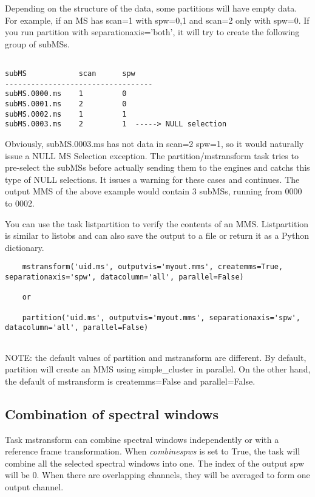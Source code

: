 Depending on the structure of the data, some partitions will have empty data.
For example, if an MS has scan=1 with spw=0,1 and scan=2 only with spw=0. If
you run partition with separationaxis='both', it will try to create the
following group of subMSs.

\begin{verbatim}

subMS            scan      spw
----------------------------------
subMS.0000.ms    1         0
subMS.0001.ms    2         0
subMS.0002.ms    1         1
subMS.0003.ms    2         1  -----> NULL selection

\end{verbatim}

Obviously, subMS.0003.ms has not data in scan=2 spw=1, so it would naturally
issue a NULL MS Selection exception. The partition/mstransform task tries to
pre-select the subMSs before actually sending them to the engines and catchs 
this type of NULL selections. It issues a warning for these cases and continues.
The output MMS of the above example would contain 3 subMSs, running from 0000
to 0002.

You can use the task listpartition to verify the contents of an MMS.
Listpartition is similar to listobs and can also save the output to a file
or return it as a Python dictionary.

\begin{verbatim}
    mstransform('uid.ms', outputvis='myout.mms', createmms=True, separationaxis='spw', datacolumn='all', parallel=False)
    
    or
    
    partition('uid.ms', outputvis='myout.mms', separationaxis='spw', datacolumn='all', parallel=False)
    
\end{verbatim}

NOTE: the default values of partition and mstransform are different.
By default, partition will create an MMS using simple_cluster in parallel.
On the other hand, the default of mstransform is createmms=False and
parallel=False.

\subsection{Combination of spectral windows}
Task mstransform can combine spectral windows independently or
with a reference frame transformation. When {\it combinespws} is set to True, the task will
combine all the selected spectral windows into one. The index of the output spw
will be 0. When there are overlapping channels, they will be averaged to form one
output channel.

